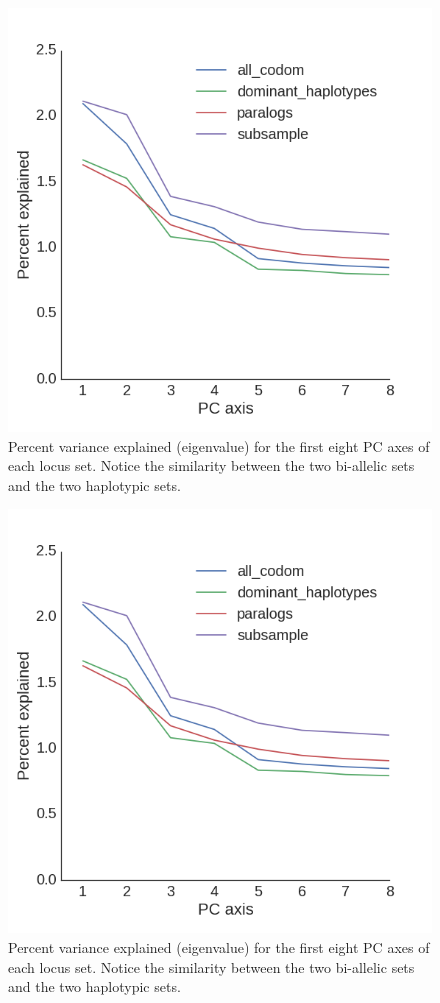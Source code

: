 \documentclass[12pt,  one column]{article}
\begin{document}
\begin{figure}[H]
\includegraphics[scale=.4]{figures/supplemental/PCA_eigenvalues.png}
\caption{Percent variance explained (eigenvalue) for the first eight PC axes of each locus set.  Notice the similarity between the two bi-allelic sets and the two haplotypic sets.}
\end{figure}

\begin{figure}[H]
\includegraphics[scale=.4]{figures/supplemental/PCA_eigenvalues.png}
\caption{Percent variance explained (eigenvalue) for the first eight PC axes of each locus set.  Notice the similarity between the two bi-allelic sets and the two haplotypic sets.}
\end{figure}
\end{document}
